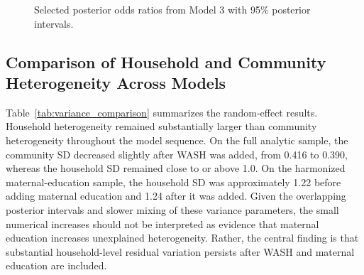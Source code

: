\begin{table}[H]
\centering
\caption{Selected posterior odds ratios from the hierarchical models}
\label{tab:key_posterior_or}
\end{table}

\begin{figure}[H]
\centering

\caption{Selected posterior odds ratios from Model 3 with 95\% posterior intervals.}
\label{fig:model3_forest}
\end{figure}

\subsection{Comparison of Household and Community Heterogeneity Across Models}

Table~\ref{tab:variance_comparison} summarizes the random-effect results. Household heterogeneity remained substantially larger than community heterogeneity throughout the model sequence. On the full analytic sample, the community SD decreased slightly after WASH was added, from 0.416 to 0.390, whereas the household SD remained close to or above 1.0. On the harmonized maternal-education sample, the household SD was approximately 1.22 before adding maternal education and 1.24 after it was added. Given the overlapping posterior intervals and slower mixing of these variance parameters, the small numerical increases should not be interpreted as evidence that maternal education increases unexplained heterogeneity. Rather, the central finding is that substantial household-level residual variation persists after WASH and maternal education are included.

